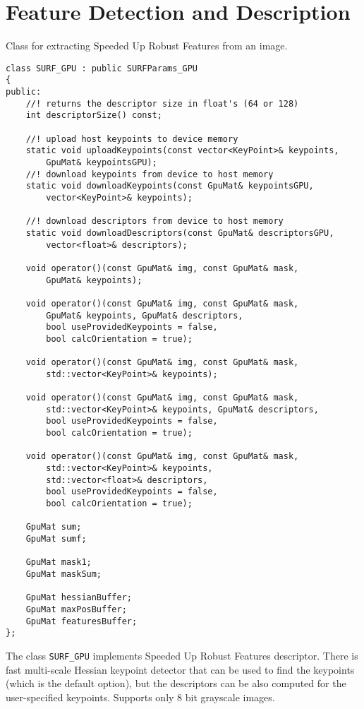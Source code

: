 \section{Feature Detection and Description}


Class for extracting Speeded Up Robust Features from an image.

\begin{lstlisting}
class SURF_GPU : public SURFParams_GPU
{
public:
    //! returns the descriptor size in float's (64 or 128)
    int descriptorSize() const;

    //! upload host keypoints to device memory
    static void uploadKeypoints(const vector<KeyPoint>& keypoints, 
        GpuMat& keypointsGPU);
    //! download keypoints from device to host memory
    static void downloadKeypoints(const GpuMat& keypointsGPU, 
        vector<KeyPoint>& keypoints);

    //! download descriptors from device to host memory
    static void downloadDescriptors(const GpuMat& descriptorsGPU, 
        vector<float>& descriptors);
    
    void operator()(const GpuMat& img, const GpuMat& mask, 
        GpuMat& keypoints);
    
    void operator()(const GpuMat& img, const GpuMat& mask, 
        GpuMat& keypoints, GpuMat& descriptors, 
        bool useProvidedKeypoints = false, 
        bool calcOrientation = true);

    void operator()(const GpuMat& img, const GpuMat& mask, 
        std::vector<KeyPoint>& keypoints);

    void operator()(const GpuMat& img, const GpuMat& mask, 
        std::vector<KeyPoint>& keypoints, GpuMat& descriptors, 
        bool useProvidedKeypoints = false, 
        bool calcOrientation = true);
    
    void operator()(const GpuMat& img, const GpuMat& mask, 
        std::vector<KeyPoint>& keypoints, 
        std::vector<float>& descriptors, 
        bool useProvidedKeypoints = false, 
        bool calcOrientation = true);

    GpuMat sum;
    GpuMat sumf;

    GpuMat mask1;
    GpuMat maskSum;

    GpuMat hessianBuffer;
    GpuMat maxPosBuffer;
    GpuMat featuresBuffer;
};
\end{lstlisting}

The class \texttt{SURF\_GPU} implements Speeded Up Robust Features descriptor. There is fast multi-scale Hessian keypoint detector that can be used to find the keypoints (which is the default option), but the descriptors can be also computed for the user-specified keypoints. Supports only 8 bit grayscale images.

